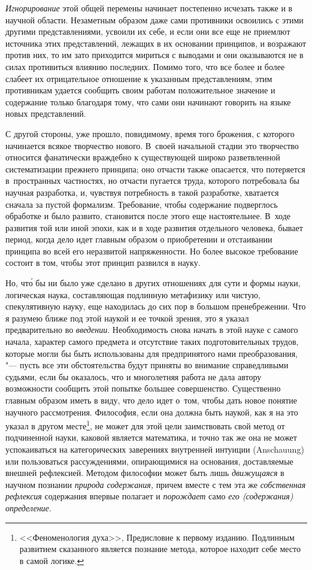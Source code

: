 {\em Игнорирование} этой общей перемены начинает постепенно исчезать также и в
научной области. Незаметным образом даже сами противники освоились с этими
другими представлениями, усвоили их себе, и если они все еще не приемлют
источника этих представлений, лежащих в их основании принципов, и возражают
против них, то им зато приходится мириться с выводами и они оказываются не в
силах противиться влиянию последних. Помимо того, что все более и более слабеет
их отрицательное отношение к указанным представлениям, этим противникам удается
сообщить своим работам положительное значение и содержание только благодаря
тому, что сами они начинают говорить на языке новых представлений.

С другой стороны, уже прошло, повидимому, время того брожения, с которого
начинается всякое творчество нового. В~своей начальной стадии это творчество
относится фанатически враждебно к существующей широко разветвленной
систематизации прежнего принципа; оно отчасти также опасается, что потеряется
в~пространных частностях, но отчасти пугается труда, которого потребовала бы
научная разработка, и, чувствуя потребность в такой разработке, хватается
сначала за пустой формализм. Требование, чтобы содержание подверглось обработке
и было развито, становится после этого еще настоятельнее. В~ходе развития той
или иной эпохи, как и в ходе развития отдельного человека, бывает период, когда
дело идет главным образом о приобретении и отстаивании принципа во всей его
неразвитой напряженности. Но более высокое требование состоит в том, чтобы этот
принцип развился в науку.

Но, чт\'{о} бы ни было уже сделано в других отношениях для сути и формы науки,
логическая наука, составляющая подлинную метафизику или чистую, спекулятивную
науку, еще находилась до сих пор в большом пренебрежении. Что я разумею ближе
под этой наукой и ее точкой зрения, это я указал предварительно во
{\em введении}. Необходимость снова начать в этой науке с самого начала,
характер самого предмета и отсутствие таких подготовительных трудов, которые
могли бы быть использованы для предпринятого нами преобразования, "--- пусть
все эти обстоятельства будут приняты во внимание справедливыми судьями, если бы
оказалось, что и многолетняя работа не дала автору возможности сообщить этой
попытке большее совершенство. Существенно главным образом иметь в виду, что
дело идет о~том, чтобы дать новое понятие научного рассмотрения. Философия,
если она должна быть наукой, как я на это указал в другом
месте\footnote{<<Феноменология духа>>, Предисловие к первому изданию. Подлинным
развитием сказанного является познание метода, которое находит себе место в
самой логике.}, не может для этой цели
заимствовать свой метод от подчиненной науки, каковой является математика, и
точно так же она не может успокаиваться на категорических заверениях внутренней
интуиции (Anschauung) или пользоваться рассуждениями, опирающимися на
основания, доставляемые внешней рефлексией. Методом философии может быть лишь
{\em движущаяся} в научном познании {\em природа содержания,} причем вместе с
тем эта же {\em собственная рефлексия} содержания впервые полагает и
{\em порождает} само {\em его (содержания) определение}.

